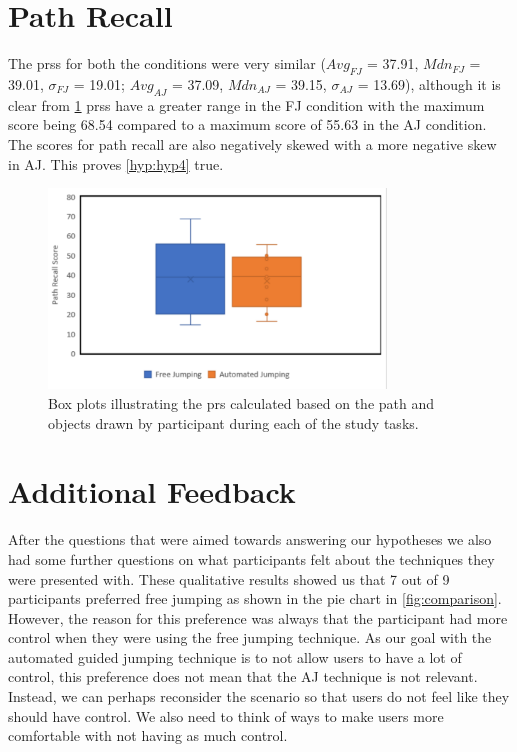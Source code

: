 \section{Path Recall}
\label{subsection EUS: Path Recall}
The \acrfull{prs}s for both the conditions were very similar
($Avg_{FJ}$ = 37.91, $Mdn_{FJ}$ = 39.01, $\sigma_{FJ}$ = 19.01; $Avg_{AJ}$ = 37.09, $Mdn_{AJ}$ = 39.15, $\sigma_{AJ}$ = 13.69), although it is clear from \cref{fig:path-recall} \acrshort{prs}s have a greater range in the FJ condition with the maximum score being 68.54 compared to a maximum score of 55.63 in the AJ condition. The scores for path recall are also negatively skewed with a more negative skew in AJ. This proves \cref{hyp:hyp4} true.

\begin{figure}[]
	\centering
	\includegraphics[width=0.8\textwidth]{images/path-recall.pdf}
	\caption{Box plots illustrating the \acrshort{prs} calculated based on the path and objects drawn by participant during each of the study tasks.}
	\label{fig:path-recall}
\end{figure}
\section{Additional Feedback}
\label{subsection EUS: Additional Feedback}
After the questions that were aimed towards answering our hypotheses we also had some further questions on what participants felt about the techniques they were presented with. These qualitative results showed us that 7 out of 9 participants preferred free jumping as shown in the pie chart in \cref{fig:comparison}. However, the reason for this preference was always that the participant had more control when they were using the free jumping technique. As our goal with the automated guided jumping technique is to not allow users to have a lot of control, this preference does not mean that the AJ technique is not relevant. Instead, we can perhaps reconsider the scenario so that users do not feel like they should have control. We also need to think of ways to make users more comfortable with not having as much control. 

